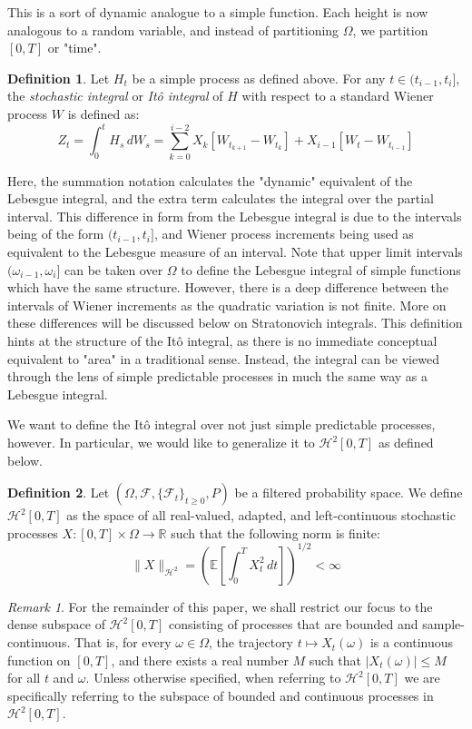 \documentclass[12pt]{article}
\theoremstyle{definition}
\newtheorem{definition}{Definition}[section]
\theoremstyle{plain}
\theoremstyle{remark}
\newtheorem{remark}{Remark}
\begin{document}
This is a sort of dynamic analogue to a simple function.  Each height is now analogous to a random variable, and instead of partitioning $\Omega$, we partition $[0,T]$ or "time". 


\begin{definition}
Let $H_t$ be a simple process as defined above. For any $t \in (t_{i-1}, t_i]$, the \textit{stochastic integral} or \textit{It\^o integral} of $H$ with respect to a standard Wiener process $W$ is defined as:
\[
Z_t = \int_0^t H_s \, dW_s = \sum_{k=0}^{i-2} X_k [W_{t_{k+1}} - W_{t_k}] + X_{i-1} [W_{t} - W_{t_{i-1}}]
\]
\end{definition}

Here, the summation notation calculates the "dynamic" equivalent of the Lebesgue integral, and the extra term calculates the integral over the partial interval.  This difference in form from the Lebesgue integral is due to the intervals being of the form $(t_{i-1}, t_i]$, and Wiener process increments being used as equivalent to the Lebesgue measure of an interval.  Note that upper limit intervals $(\omega_{i-1}, \omega_i]$ can be taken over $\Omega$ to define the Lebesgue integral of simple functions which have the same structure.  However, there is a deep difference between the intervals of Wiener increments as the quadratic variation is not finite.  More on these differences will be discussed below on Stratonovich integrals.  This definition hints at the structure of the It\^o integral, as there is no immediate conceptual equivalent to "area" in a traditional sense.  Instead, the integral can be viewed through the lens of simple predictable processes in much the same way as a Lebesgue integral.  

We want to define the It\^o integral over not just simple predictable processes, however.  In particular, we would like to generalize it to $\mathcal{H}^2[0,T]$ as defined below.

\begin{definition}
Let $(\Omega, \mathcal{F}, \{\mathcal{F}_t\}_{t \geq 0}, P)$ be a filtered probability space. We define $\mathcal{H}^2[0,T]$ as the space of all real-valued, adapted, and left-continuous stochastic processes $X: [0,T] \times \Omega \to \mathbb{R}$ such that the following norm is finite:
\[
\|X\|_{\mathcal{H}^2} = \left( \mathbb{E}\left[ \int_0^T X_t^2 \, dt \right] \right)^{1/2} < \infty
\]
\end{definition}

\begin{remark}
For the remainder of this paper, we shall restrict our focus to the dense subspace of $\mathcal{H}^2[0,T]$ consisting of processes that are bounded and sample-continuous. That is, for every $\omega \in \Omega$, the trajectory $t \mapsto X_t(\omega)$ is a continuous function on $[0,T]$, and there exists a real number $M$ such that $|X_t(\omega)| \leq M$ for all $t$ and $\omega$.  Unless otherwise specified, when referring to $\mathcal{H}^2[0,T]$ we are specifically referring to the subspace of bounded and continuous processes in $\mathcal{H}^2[0,T]$.
\end{remark}
\end{document}

